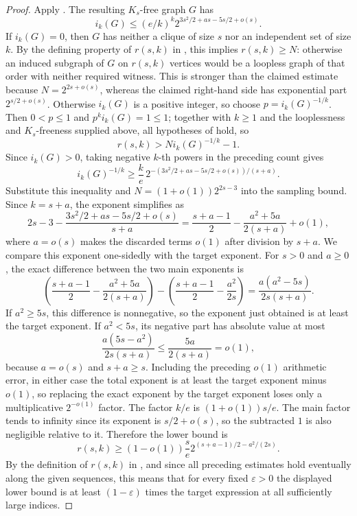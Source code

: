 \begin{proof}
Apply .  The resulting $K_s$-free graph
$G$ has
\[
 i_k(G)\leq(e/k)^k
 2^{3s^2/2+as-5s/2+o(s)}.
\]
If $i_k(G)=0$, then $G$ has neither a clique of size $s$ nor an
independent set of size $k$.  By the defining property of $r(s,k)$ in
, this implies $r(s,k)\geq N$: otherwise an induced
subgraph of $G$ on $r(s,k)$ vertices would be a loopless graph of that
order with neither required witness.  This is stronger than the claimed
estimate because $N=2^{2s+o(s)}$, whereas the claimed right-hand side has
exponential part $2^{s/2+o(s)}$.  Otherwise $i_k(G)$ is a positive integer,
so choose
$p=i_k(G)^{-1/k}$.  Then $0<p\leq1$ and $p^k i_k(G)=1\leq1$; together
with $k\geq1$ and the looplessness and $K_s$-freeness supplied above, all
hypotheses of  hold, so
\[
 r(s,k)>N i_k(G)^{-1/k}-1.
\]
Since $i_k(G)>0$, taking negative $k$-th powers in the preceding count
gives
\[
 i_k(G)^{-1/k}\geq\frac{k}{e}\,
 2^{-(3s^2/2+as-5s/2+o(s))/(s+a)}.
\]
Substitute this inequality and $N=(1+o(1))2^{2s-3}$ into the sampling
bound.  Since $k=s+a$, the exponent simplifies as
\[
 2s-3-\frac{3s^2/2+as-5s/2+o(s)}{s+a}
 =\frac{s+a-1}{2}-\frac{a^2+5a}{2(s+a)}+o(1),
\]
where $a=o(s)$ makes the discarded terms $o(1)$ after division by
$s+a$.  We compare this exponent one-sidedly with the target exponent.
For $s>0$ and $a\geq0$, the exact difference between the two main
exponents is
\[
 \left(\frac{s+a-1}{2}-\frac{a^2+5a}{2(s+a)}\right)
 -\left(\frac{s+a-1}{2}-\frac{a^2}{2s}\right)
 =\frac{a(a^2-5s)}{2s(s+a)}.
\]
If $a^2\geq5s$, this difference is nonnegative, so the exponent just
obtained is at least the target exponent.  If $a^2<5s$, its negative
part has absolute value at most
\[
 \frac{a(5s-a^2)}{2s(s+a)}
 \leq \frac{5a}{2(s+a)}=o(1),
\]
because $a=o(s)$ and $s+a\geq s$.  Including the preceding $o(1)$
arithmetic error, in either case the total exponent is at least the
target exponent minus $o(1)$, so replacing the exact exponent by the
target exponent loses only a multiplicative $2^{-o(1)}$ factor.
The factor $k/e$ is $(1+o(1))s/e$.  The main factor tends to infinity
since its exponent is $s/2+o(s)$, so the subtracted $1$ is also
negligible relative to it.  Therefore the lower bound is
\[
 r(s,k)\geq (1-o(1))\frac{s}{e}
 2^{(s+a-1)/2-a^2/(2s)}.
\]
By the definition of $r(s,k)$ in , and since all
preceding estimates hold eventually along the given sequences, this
means that for every fixed $\varepsilon>0$ the displayed lower bound is
at least $(1-\varepsilon)$ times the target expression at all sufficiently
large indices.
\end{proof}
